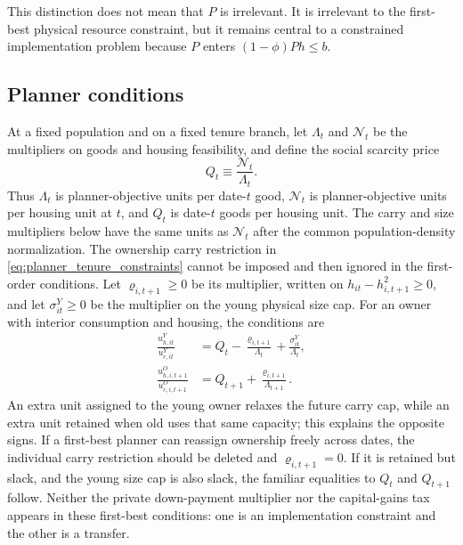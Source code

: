 \documentclass[11pt]{article}
\newcommand{\1}{\mathbf 1}
\newcommand{\Nu}{\mathcal N}
\begin{document}
This distinction does not mean that $P$ is irrelevant. It is irrelevant to the
first-best physical resource constraint, but it remains central to a
constrained implementation problem because $P$ enters
$(1-\phi)Ph\le b$.

\subsection{Planner conditions}

At a fixed population and on a fixed tenure branch, let $\Lambda_t$ and
$\Nu_t$ be the multipliers on goods and housing feasibility, and define the
social scarcity price
\begin{equation}
Q_t\equiv\frac{\Nu_t}{\Lambda_t}.
\end{equation}
Thus $\Lambda_t$ is planner-objective units per date-$t$ good, $\Nu_t$ is
planner-objective units per housing unit at $t$, and $Q_t$ is date-$t$ goods
per housing unit. The carry and size multipliers below have the same units as
$\Nu_t$ after the common population-density normalization.
The ownership carry restriction in \eqref{eq:planner_tenure_constraints}
cannot be imposed and then ignored in the first-order conditions. Let
$\varrho_{i,t+1}\ge0$ be its multiplier, written on
$h_{it}-h_{i,t+1}^2\ge0$, and let $\sigma_{it}^Y\ge0$ be the multiplier on the
young physical size cap. For an owner with interior consumption and housing,
the conditions are
\begin{align}
\frac{u_{h,it}^Y}{u_{c,it}^Y}
&=Q_t-\frac{\varrho_{i,t+1}}{\Lambda_t}
  +\frac{\sigma_{it}^Y}{\Lambda_t},
\label{eq:planner_h_young}\\
\frac{u_{h,i,t+1}^O}{u_{c,i,t+1}^O}
&=Q_{t+1}+\frac{\varrho_{i,t+1}}{\Lambda_{t+1}}.
\label{eq:planner_h_old}
\end{align}
An extra unit assigned to the young owner relaxes the future carry cap, while
an extra unit retained when old uses that same capacity; this explains the
opposite signs. If a first-best planner can reassign ownership freely across
dates, the individual carry restriction should be deleted and
$\varrho_{i,t+1}=0$. If it is retained but slack, and the young size cap is
also slack, the familiar equalities to $Q_t$ and $Q_{t+1}$ follow. Neither the
private down-payment multiplier nor the capital-gains tax appears in these
first-best conditions: one is an implementation constraint and the other is a
transfer.
\end{document}
